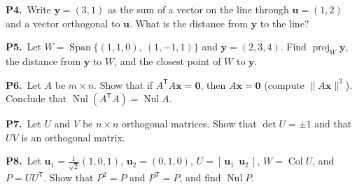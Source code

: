 \documentclass[10pt]{scrartcl}
\newcommand{\vv}[1]{\mathbf{#1}}
\DeclareMathOperator{\spn}{Span}\DeclareMathOperator{\Nul}{Nul}\DeclareMathOperator{\Col}{Col}\DeclareMathOperator{\Row}{Row}\DeclareMathOperator{\tr}{tr}\DeclareMathOperator{\proj}{proj}\DeclareMathOperator{\dist}{dist}
\begin{document}
\begin{prob}
  \textbf{P4.}\ Write $\vv y=(3,1)$ as the sum of a vector on the line through $\vv u=(1,2)$ and a vector orthogonal to $\vv u$. What is the distance from $\vv y$ to the line?
\end{prob}

\begin{prob}
  \textbf{P5.}\ Let $W=\spn\{(1,1,0),\ (1,-1,1)\}$ and $\vv y=(2,3,4)$. Find $\proj_W\vv y$, the distance from $\vv y$ to $W$, and the closest point of $W$ to $\vv y$.
\end{prob}

\begin{prob}
  \textbf{P6.}\ Let $A$ be $m\times n$. Show that if $A^{\mathsf T}A\vv x=\vv 0$, then $A\vv x=\vv 0$ (compute $\|A\vv x\|^2$). Conclude that $\Nul(A^{\mathsf T}A)=\Nul A$.
\end{prob}

\begin{prob}
  \textbf{P7.}\ Let $U$ and $V$ be $n\times n$ orthogonal matrices. Show that $\det U=\pm1$ and that $UV$ is an orthogonal matrix.
\end{prob}

\begin{prob}
  \textbf{P8.}\ Let $\vv u_1=\frac{1}{\sqrt{2}}(1,0,1)$, $\vv u_2=(0,1,0)$, $U=[\,\vv u_1\ \ \vv u_2\,]$, $W=\Col U$, and $P=UU^{\mathsf T}$. Show that $P^2=P$ and $P^{\mathsf T}=P$, and find $\Nul P$.
\end{prob}
\end{document}
